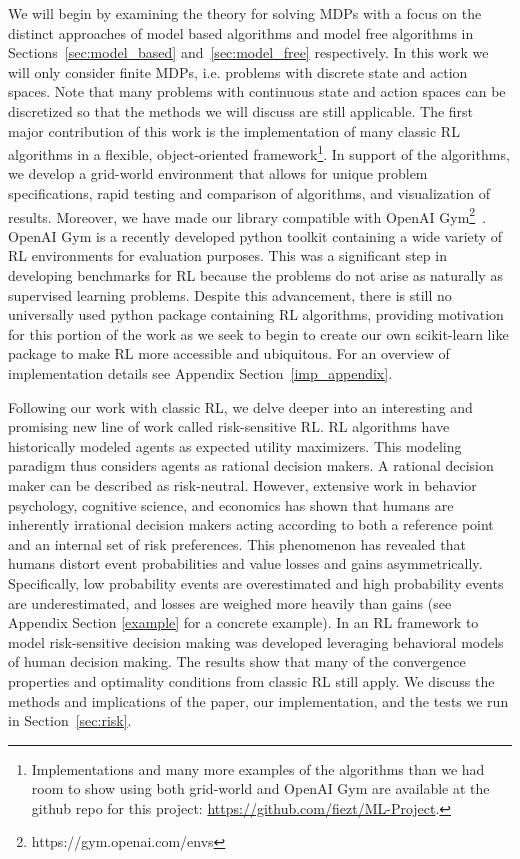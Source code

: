 \documentclass{article}
\begin{document}
We will begin by examining the theory for solving MDPs with a focus on the distinct approaches of model based algorithms and model free algorithms in Sections~\ref{sec:model_based} and~\ref{sec:model_free} respectively. In this work we will only consider finite MDPs, i.e. problems with discrete state and action spaces. Note that many problems with continuous state and action spaces can be discretized so that the methods we will discuss are still applicable. The first major contribution of this work is the implementation of many classic RL algorithms in a flexible, object-oriented framework\footnote{Implementations and many more examples of the algorithms than we had room to show using both grid-world and OpenAI Gym are available at the github repo for this project: \url{https://github.com/fiezt/ML-Project}.}. In support of the algorithms, we develop a grid-world environment that allows for unique problem specifications, rapid testing and comparison of algorithms, and visualization of results. Moreover, we have made our library compatible with OpenAI Gym\footnote{https://gym.openai.com/envs}~\cite{DBLP:journals/corr/BrockmanCPSSTZ16}. OpenAI Gym is a recently developed python toolkit containing a wide variety of RL environments for evaluation purposes. This was a significant step in developing benchmarks for RL because the problems do not arise as naturally as supervised learning problems. Despite this advancement, there is still no universally used python package containing RL algorithms, providing motivation for this portion of the work as we seek to begin to create our own scikit-learn like package to make RL more accessible and ubiquitous. For an overview of implementation details see Appendix Section~\ref{imp_appendix}.

Following our work with classic RL, we delve deeper into an interesting and promising new line of work called risk-sensitive RL. RL algorithms have historically modeled agents as expected utility maximizers. This modeling paradigm thus considers agents as rational decision makers. A rational decision maker can be described as risk-neutral. However, extensive work in behavior psychology, cognitive science, and economics has shown that humans are inherently irrational decision makers acting according to both a reference point and an internal set of risk preferences. This phenomenon has revealed that humans distort event probabilities and value losses and gains asymmetrically. Specifically, low probability events are overestimated and high probability events are underestimated, and losses are weighed more heavily than gains (see Appendix Section \ref{example} for a concrete example). In \cite{DBLP:journals/corr/ShenTSO13} an RL framework to model risk-sensitive decision making was developed leveraging behavioral models of human decision making. The results show that many of the convergence properties and optimality conditions from classic RL still apply. We discuss the methods and implications of the paper, our implementation, and the tests we run in Section~\ref{sec:risk}.
\end{document}
